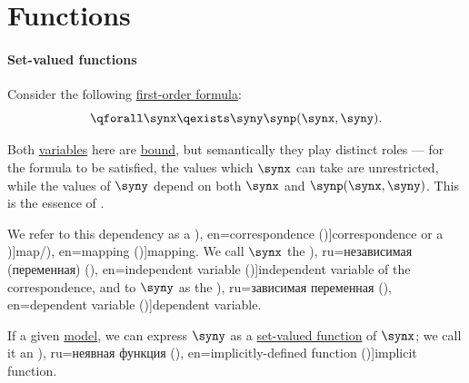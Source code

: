 \section{Functions}\label{sec:functions}

\paragraph{Set-valued functions}

\begin{concept}\label{con:variable_dependence}
  Consider the following \hyperref[def:fol_formula]{first-order formula}:
  \begin{equation*}
    \qforall \synx \qexists \syny \synp(\synx, \syny).
  \end{equation*}

  Both \hyperref[con:variable]{variables} here are \hyperref[con:variable_binding]{bound}, but semantically they play distinct roles --- for the formula to be satisfied, the values which \( \synx \) can take are unrestricted, while the values of \( \syny \) depend on both \( \synx \) and \( \synp(\synx, \syny) \). This is the essence of .

  We refer to this dependency as a \term[ru=соотвествие (\cite[\S 1.2.5]{КусраевКутателадзе2005БулевозначныйАнализ}), en=correspondence (\cite[30]{Halmos1960NaiveSetTheory})]{correspondence} or a \term[en=map (\cite[30]{Halmos1960NaiveSetTheory})]{map}/\term[ru=отображение (\cite[\S 1.2.4]{КусраевКутателадзе2005БулевозначныйАнализ}), en=mapping (\cite[30]{Halmos1960NaiveSetTheory})]{mapping}. We call \( \synx \) the \term[bg=независима променлива (\cite[127]{Тагамлицки1971ДиференциалноСмятане}), ru=независимая (переменная) (\cite[39]{ИльинСадовничийСендов1985АнализТом1}), en=independent variable (\cite[74]{Kleene2002Logic})]{independent variable} of the correspondence, and to \( \syny \) as the \term[bg=зависима променлива (\cite[127]{Тагамлицки1971ДиференциалноСмятане}), ru=зависимая переменная (\cite[39]{ИльинСадовничийСендов1985АнализТом1}), en=dependent variable (\cite[74]{Kleene2002Logic})]{dependent variable}.

  If a given \hyperref[con:logical_model]{model}, we can express \( \syny \) as a \hyperref[def:function]{set-valued function} of \( \synx \); we call it an \term[bg=неявна функция (\cite[377]{Тагамлицки1971ДиференциалноСмятане}), ru=неявная функция (\cite[314]{Фихтенгольц1968ОсновыАнализаТом2}), en=implicitly-defined function (\cite[29]{DontchevRockafellar2014SolutionMappings})]{implicit function}.
\end{concept}
